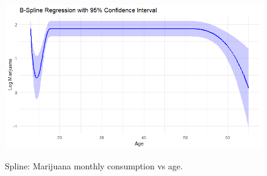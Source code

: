 \begin{enumerate}[leftmargin=*]
\begin{figure}[!h]
	\includegraphics[width=340pt, height=200pt]{Chapters/chapter11/figures/AgeMarijuana.png}
	\caption[List of figure caption goes here]{Spline: Marijuana monthly consumption vs age.}\label{figAgeMarijuana}
\end{figure}

\end{enumerate}